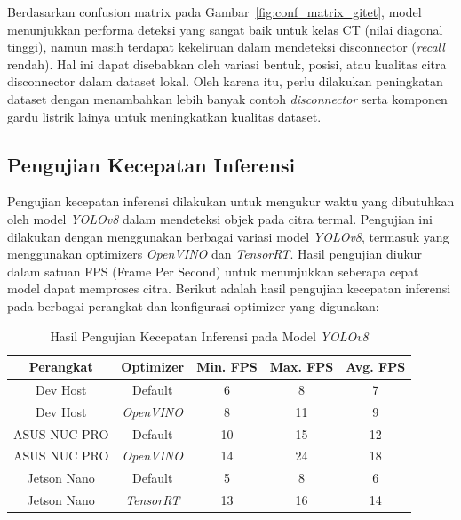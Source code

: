 Berdasarkan confusion matrix pada Gambar~\ref{fig:conf_matrix_gitet}, model menunjukkan performa deteksi yang sangat baik untuk kelas CT (nilai diagonal tinggi), namun masih terdapat kekeliruan dalam mendeteksi disconnector (\emph{recall} rendah). Hal ini dapat disebabkan oleh variasi bentuk, posisi, atau kualitas citra disconnector dalam dataset lokal. Oleh karena itu, perlu dilakukan peningkatan dataset dengan menambahkan lebih banyak contoh \emph{disconnector} serta komponen gardu listrik lainya untuk meningkatkan kualitas dataset.

\subsection{Pengujian Kecepatan Inferensi}
Pengujian kecepatan inferensi dilakukan untuk mengukur waktu yang dibutuhkan oleh model \emph{YOLOv8} dalam mendeteksi objek pada citra termal. Pengujian ini dilakukan dengan menggunakan berbagai variasi model \emph{YOLOv8}, termasuk yang menggunakan optimizers \emph{OpenVINO} dan \emph{TensorRT}. Hasil pengujian diukur dalam satuan FPS (Frame Per Second) untuk menunjukkan seberapa cepat model dapat memproses citra. Berikut adalah hasil pengujian kecepatan inferensi pada berbagai perangkat dan konfigurasi optimizer yang digunakan:

\begin{table}[H]
	\centering
	\caption{Hasil Pengujian Kecepatan Inferensi pada Model \emph{YOLOv8}}
	\label{tab:kecepatan_inferensi}
	\begin{tabular}{|c|c|c|c|c|}
		\hline
		\textbf{Perangkat} & \textbf{Optimizer} & \textbf{Min. FPS} & \textbf{Max. FPS} & \textbf{Avg. FPS} \\
		\hline
		Dev Host           & Default            & 6                 & 8                 & 7                 \\
		Dev Host           & \emph{OpenVINO}    & 8                 & 11                & 9                 \\
		ASUS NUC PRO       & Default            & 10                & 15                & 12                \\
		ASUS NUC PRO       & \emph{OpenVINO}    & 14                & 24                & 18                \\
		Jetson Nano        & Default            & 5                 & 8                 & 6                 \\
		Jetson Nano        & \emph{TensorRT}    & 13                & 16                & 14                \\
		\hline
	\end{tabular}
\end{table}

